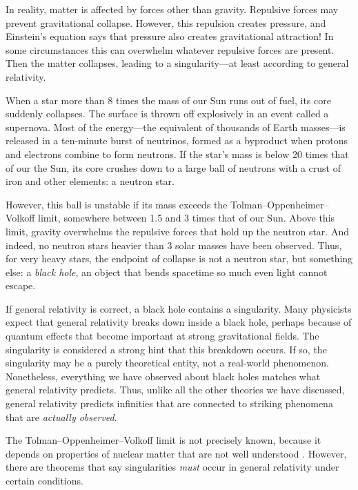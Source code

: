\documentclass[12pt]{article}
\begin{document}
In reality, matter is affected by forces other than gravity.  Repulsive forces may prevent gravitational collapse.  However, this repulsion creates pressure, and Einstein's equation says that pressure also creates gravitational attraction!   In some circumstances this can overwhelm whatever repulsive forces are present.  Then the matter collapses, leading to a singularity---at least according to general relativity.

When a star more than 8 times the mass of our Sun runs out of fuel, its core suddenly collapses.  The surface is thrown off explosively in an event called a supernova.   Most of the energy---the equivalent of thousands of Earth masses---is released in a ten-minute burst of neutrinos, formed as a byproduct when protons and electrons combine to form neutrons.  If the star's mass is below 20 times that of our the Sun, its core crushes down to a large ball of neutrons with a crust of iron and other elements: a neutron star.

However, this ball is unstable if its mass exceeds the Tolman--Oppenheimer--Volkoff limit, somewhere between 1.5 and 3 times that of our Sun.   Above this limit, gravity overwhelms the repulsive forces that hold up the neutron star.  And indeed, no neutron stars heavier than 3 solar masses have been observed.   Thus, for very heavy stars, the endpoint of collapse is not a neutron star, but something else: a \emph{black hole}, an object that bends spacetime so much even light cannot escape.

If general relativity is correct, a black hole contains a singularity.  Many physicists expect that general relativity breaks down inside a black hole, perhaps because of quantum effects that become important at strong gravitational fields.  The singularity is considered a strong hint that this breakdown occurs.   If so, the singularity may be a purely theoretical entity, not a real-world phenomenon.  Nonetheless, everything we have observed about black holes matches what general relativity predicts.  Thus, unlike all the other theories we have discussed, general relativity predicts infinities that are connected to striking phenomena that are \emph{actually observed}.

The Tolman--Oppenheimer--Volkoff limit is not precisely known, because it depends on properties of nuclear matter that are not well understood \cite{Bombaci}.  However, there are theorems that say singularities \emph{must} occur in general relativity under certain conditions.  
\end{document}

